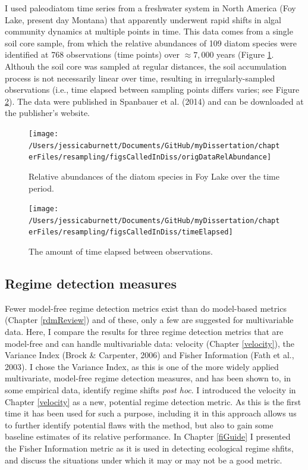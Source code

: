 \documentclass[12pt,twoside,openany]{reedthesis}
\begin{document}
I used paleodiatom time series from a freshwater system in North America (Foy Lake, present day Montana) that apparently underwent rapid shifts in algal community dynamics at multiple points in time. This data comes from a single soil core sample, from which the relative abundances of 109 diatom species were identified at 768 observations (time points) over \(\approx7,000\) years (Figure \ref{fig:origDat}. Althouh the soil core was sampled at regular distances, the soil accumulation process is not necessarily linear over time, resulting in irregularly-sampled observations (i.e., time elapsed between sampling points differs varies; see Figure \ref{fig:timeElapsed}). The data were published in Spanbauer et al. (2014) and can be downloaded at the publisher's website.
\begin{figure}

{\centering \texttt{[image: /Users/jessicaburnett/Documents/GitHub/myDissertation/chapterFiles/resampling/figsCalledInDiss/origDataRelAbundance]} 

}

\caption{Relative abundances of the diatom species in Foy Lake over the time period.}\label{fig:origDat}
\end{figure}
\begin{figure}

{\centering \texttt{[image: /Users/jessicaburnett/Documents/GitHub/myDissertation/chapterFiles/resampling/figsCalledInDiss/timeElapsed]} 

}

\caption{The amount of time elapsed between observations.}\label{fig:timeElapsed}
\end{figure}
\hypertarget{regime-detection-measures}{%
\subsection{Regime detection measures}\label{regime-detection-measures}}

Fewer model-free regime detection metrics exist than do model-based metrics (Chapter \ref{rdmReview}) and of these, only a few are suggested for multivariable data. Here, I compare the results for three regime detection metrics that are model-free and can handle multivariable data: velocity (Chapter \ref{velocity}), the Variance Index (Brock \& Carpenter, 2006) and Fisher Information (Fath et al., 2003). I chose the Variance Index, as this is one of the more widely applied multivariate, model-free regime detection measures, and has been shown to, in some empirical data, identify regime shifts \emph{post hoc}. I introduced the velocity in Chapter \ref{velocity} as a new, potential regime detection metric. As this is the first time it has been used for such a purpose, including it in this approach allows us to further identify potential flaws with the method, but also to gain some baseline estimates of its relative performance. In Chapter \ref{fiGuide} I presented the Fisher Information metric as it is used in detecting ecological regime shfits, and discuss the situations under which it may or may not be a good metric.
\end{document}
